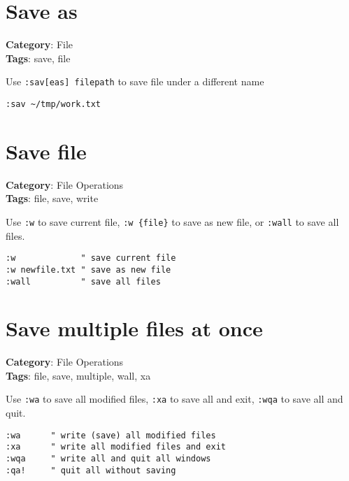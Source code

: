 {{{{{{\section{Save as}

\textbf{Category}: File\\ \textbf{Tags}: save, file
\vspace{0.5cm}

Use {\footnotesize \Verb§:sav[eas] filepath§} to save file under a different name

\begin{Exa*}{}
\begin{Verbatim}[fontsize=\footnotesize, breaklines, breakanywhere]
:sav ~/tmp/work.txt
\end{Verbatim}
\end{Exa*}

\section{Save file}

\textbf{Category}: File Operations\\ \textbf{Tags}: file, save, write
\vspace{0.5cm}

Use {\footnotesize \Verb§:w§} to save current file, {\footnotesize \Verb§:w {file}§} to save as new file, or {\footnotesize \Verb§:wall§} to save all files.

\begin{Exa*}{}
\begin{Verbatim}[fontsize=\footnotesize, breaklines, breakanywhere]
:w             " save current file
:w newfile.txt " save as new file
:wall          " save all files
\end{Verbatim}
\end{Exa*}

\section{Save multiple files at once}

\textbf{Category}: File Operations\\ \textbf{Tags}: file, save, multiple, wall, xa
\vspace{0.5cm}

Use {\footnotesize \Verb§:wa§} to save all modified files, {\footnotesize \Verb§:xa§} to save all and exit, {\footnotesize \Verb§:wqa§} to save all and quit.

\begin{Exa*}{}
\begin{Verbatim}[fontsize=\footnotesize, breaklines, breakanywhere]
:wa      " write (save) all modified files
:xa      " write all modified files and exit
:wqa     " write all and quit all windows
:qa!     " quit all without saving
\end{Verbatim}
\end{Exa*}

}}}}}}
